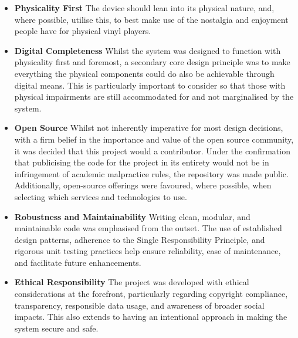             \begin{itemize}
                \item \textbf{Physicality First} The device should lean into its physical nature, and, where possible, utilise this, to best make use of the nostalgia and enjoyment people have for physical vinyl players.
            \end{itemize}
    
            \begin{itemize}
                \item \textbf{Digital Completeness} Whilst the system was designed to function with physicality first and foremost, a secondary core design principle was to make everything the physical components could do also be achievable through digital means. This is particularly important to consider so that those with physical impairments are still accommodated for and not marginalised by the system.
            \end{itemize}
    
            \begin{itemize}
                \item \textbf{Open Source} Whilst not inherently imperative for most design decisions, with a firm belief in the importance and value of the open source community, it was decided that this project would a contributor. Under the confirmation that publicising the code for the project in its entirety would not be in infringement of academic malpractice rules, the repository was made public. Additionally, open-source offerings were favoured, where possible, when selecting which services and technologies to use.
            \end{itemize}
    
            \begin{itemize}
                \item \textbf{Robustness and Maintainability} Writing clean, modular, and maintainable code was emphasised from the outset. The use of established design patterns, adherence to the Single Responsibility Principle, and rigorous unit testing practices help ensure reliability, ease of maintenance, and facilitate future enhancements.
            \end{itemize}
    
            \begin{itemize}
                \item \textbf{Ethical Responsibility} The project was developed with ethical considerations at the forefront, particularly regarding copyright compliance, transparency, responsible data usage, and awareness of broader social impacts. This also extends to having an intentional approach in making the system secure and safe.
            \end{itemize}
        

